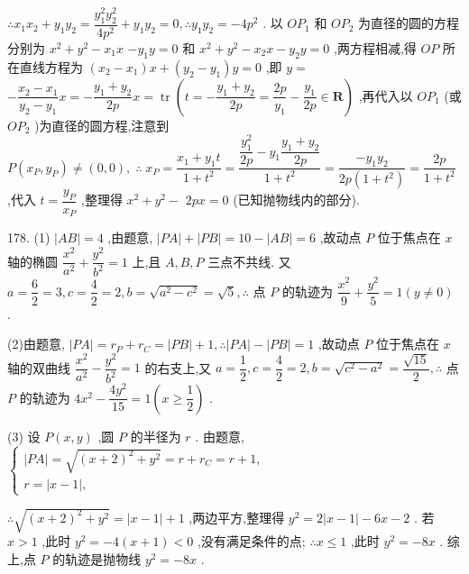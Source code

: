 $\therefore {x}_{1}{x}_{2} + {y}_{1}{y}_{2} = \dfrac{{y}_{1}^{2}{y}_{2}^{2}}{4{p}^{2}} + {y}_{1}{y}_{2} = 0,\therefore {y}_{1}{y}_{2} =  - 4{p}^{2}$ . 以 $O{P}_{1}$ 和 $O{P}_{2}$ 为直径的圆的方程分别为 ${x}^{2} + {y}^{2} - {x}_{1}x$  $- {y}_{1}y = 0$ 和 ${x}^{2} + {y}^{2} - {x}_{2}x - {y}_{2}y = 0$ ,两方程相减,得 ${OP}$ 所在直线方程为 $\left( {{x}_{2} - {x}_{1}}\right) x + \left( {{y}_{2} - {y}_{1}}\right) y = 0$ ,即 $y =$  $- \dfrac{{x}_{2} - {x}_{1}}{{y}_{2} - {y}_{1}}x =  - \dfrac{{y}_{1} + {y}_{2}}{2p}x = \operatorname{tr}\left( {t =  - \dfrac{{y}_{1} + {y}_{2}}{2p} = \dfrac{2p}{{y}_{1}} - \dfrac{{y}_{1}}{2p} \in  \mathbf{R}}\right)$ ,再代入以 $O{P}_{1}$ (或 $O{P}_{2}$ )为直径的圆方程,注意到 $P\left( {{x}_{P},{y}_{P}}\right)  \neq  \left( {0,0}\right) ,\;\therefore \;{x}_{P} = \dfrac{{x}_{1} + {y}_{1}t}{1 + {t}^{2}} = \dfrac{\dfrac{{y}_{1}^{2}}{2p} - {y}_{1}\dfrac{{y}_{1} + {y}_{2}}{2p}}{1 + {t}^{2}} = \dfrac{-{y}_{1}{y}_{2}}{{2p}\left( {1 + {t}^{2}}\right) } = \dfrac{2p}{1 + {t}^{2}}$ ,代入 $t = \dfrac{{y}_{P}}{{x}_{P}}$ ,整理得 ${x}^{2} + {y}^{2} -$  ${2px} = 0$ (已知抛物线内的部分).

178. (1) $\left| {AB}\right|  = 4$ ,由题意, $\left| {PA}\right|  + \left| {PB}\right|  = {10} - \left| {AB}\right|  = 6$ ,故动点 $P$ 位于焦点在 $x$ 轴的椭圆 $\dfrac{{x}^{2}}{{a}^{2}} + \dfrac{{y}^{2}}{{b}^{2}} = 1$ 上,且 $A,B,P$ 三点不共线. 又 $a = \dfrac{6}{2} = 3,c = \dfrac{4}{2} = 2,b = \sqrt{{a}^{2} - {c}^{2}} = \sqrt{5},\therefore$ 点 $P$ 的轨迹为 $\dfrac{{x}^{2}}{9} + \dfrac{{y}^{2}}{5} = 1\left( {y \neq  0}\right)$ .

(2)由题意, $\left| {PA}\right|  = {r}_{P} + {r}_{C} = \left| {PB}\right|  + 1,\therefore \left| {PA}\right|  - \left| {PB}\right|  = 1$ ,故动点 $P$ 位于焦点在 $x$ 轴的双曲线 $\dfrac{{x}^{2}}{{a}^{2}} - \dfrac{{y}^{2}}{{b}^{2}} = 1$ 的右支上,又 $a = \dfrac{1}{2},c = \dfrac{4}{2} = 2,b = \sqrt{{c}^{2} - {a}^{2}} = \dfrac{\sqrt{15}}{2},\therefore$ 点 $P$ 的轨迹为 $4{x}^{2} - \dfrac{4{y}^{2}}{15} = 1\left( {x \geq  \dfrac{1}{2}}\right)$ .

(3) 设 $P\left( {x,y}\right)$ ,圆 $P$ 的半径为 $r$ . 由题意, $\left\{  \begin{array}{l} \left| {PA}\right|  = \sqrt{{\left( x + 2\right) }^{2} + {y}^{2}} = r + {r}_{C} = r + 1, \\  r = \left| {x - 1}\right| , \end{array}\right.$

$\therefore \sqrt{{\left( x + 2\right) }^{2} + {y}^{2}} = \left| {x - 1}\right|  + 1$ ,两边平方,整理得 ${y}^{2} = 2\left| {x - 1}\right|  - {6x} - 2$ . 若 $x > 1$ ,此时 ${y}^{2} =  - 4\left( {x + 1}\right)  < 0$ ,没有满足条件的点; $\therefore x \leq  1$ ,此时 ${y}^{2} =  - {8x}$ . 综上,点 $P$ 的轨迹是抛物线 ${y}^{2} =  - {8x}$ .


